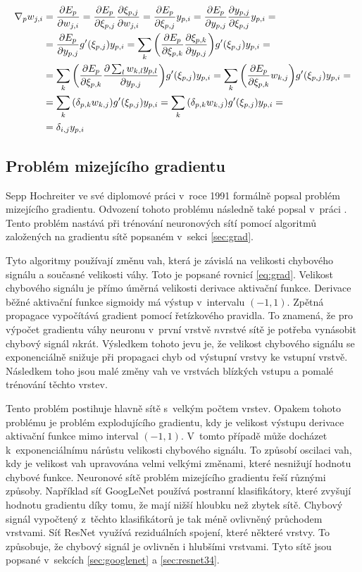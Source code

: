 \begin{align}
\nabla_{p}w_{j,i}&=\pdv{E_p}{w_{j,i}}=\pdv{E_p}{\xi_{p,j}}\pdv{\xi_{p,j}}{w_{j,i}}=\pdv{E_p}{\xi_{p,j}}y_{p,i}=\pdv{E_p}{y_{p,j}}\pdv{y_{p,j}}{\xi_{p,j}}y_{p,i}=\nonumber\\
&=\pdv{E_p}{y_{p,j}}g'(\xi_{p,j})y_{p,i}=\sum_{k}{\left(\pdv{E_p}{\xi_{p,k}}\pdv{\xi_{p,k}}{y_{p,j}}\right)}g'(\xi_{p,j})y_{p,i}=\nonumber\\
&=\sum_{k}{\left(\pdv{E_p}{\xi_{p,k}}\pdv{\sum_{l}{w_{k,l}y_{p,l}}}{y_{p,j}}\right)}g'(\xi_{p,j})y_{p,i}=\sum_{k}{\left(\pdv{E_p}{\xi_{p,k}}w_{k,j}\right)}g'(\xi_{p,j})y_{p,i}=\nonumber\\
&=\sum_{k}{\left(\delta_{p,k}w_{k,j}\right)}g'(\xi_{p,j})y_{p,i}=\sum_{k}{\left(\delta_{p,k}w_{k,j}\right)}g'(\xi_{p,j})y_{p,i}=\nonumber\\
&=\delta_{i,j}y_{p,i}
\label{eq:grad_hid}
\end{align}

\subsection{Problém mizejícího gradientu}
\label{sub:van_grad}

Sepp Hochreiter ve své diplomové práci \cite{Hochreiter1991} v~roce 1991 formálně popsal problém mizejícího gradientu.
Odvození tohoto problému následně také popsal v~práci \cite{Hochreiter2001}.
Tento problém nastává při trénování neuronových sítí pomocí algoritmů založených na gradientu sítě popsaném v~sekci \ref{sec:grad}.

Tyto algoritmy používají změnu vah, která je závislá na velikosti chybového signálu a současné velikosti váhy.
Toto je popsané rovnicí \ref{eq:grad}.
Velikost chybového signálu je přímo úměrná velikosti derivace aktivační funkce.
Derivace běžné aktivační funkce sigmoidy má výstup v~intervalu $(-1,1)$.
Zpětná propagace vypočítává gradient pomocí řetízkového pravidla.
To znamená, že pro výpočet gradientu váhy neuronu v~první vrstvě $n$vrstvé sítě je potřeba vynásobit chybový signál $n$krát.
Výsledkem tohoto jevu je, že velikost chybového signálu se exponenciálně snižuje při propagaci chyb od výstupní vrstvy ke vstupní vrstvě.
Následkem toho jsou malé změny vah ve vrstvách blízkých vstupu a pomalé trénování těchto vrstev.

Tento problém postihuje hlavně sítě s~velkým počtem vrstev.
Opakem tohoto problému je problém explodujícího gradientu, kdy je velikost výstupu derivace aktivační funkce mimo interval $(-1,1)$.
V~tomto případě může docházet k~exponenciálnímu nárůstu velikosti chybového signálu.
To způsobí oscilaci vah, kdy je velikost vah upravována velmi velkými změnami, které nesnižují hodnotu chybové funkce.
Neuronové sítě problém mizejícího gradientu řeší různými způsoby.
Například síť GoogLeNet používá postranní klasifikátory, které zvyšují hodnotu gradientu díky tomu, že mají nižší hloubku než zbytek sítě.
Chybový signál vypočtený z~těchto klasifikátorů je tak méně ovlivněný průchodem vrstvami.
Síť ResNet využívá reziduálních spojení, které  některé vrstvy.
To způsobuje, že chybový signál je ovlivněn i hlubšími vrstvami.
Tyto sítě jsou popsané v~sekcích \ref{sec:googlenet} a \ref{sec:resnet34}.

